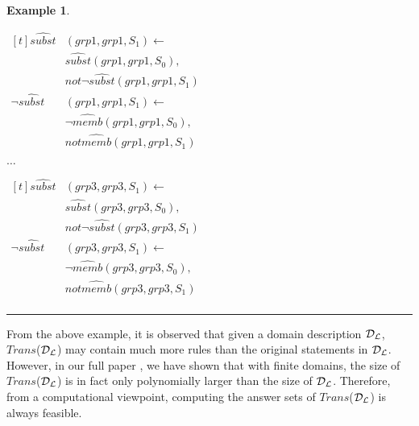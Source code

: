\documentclass[11pt, twocolumn]{article}
\newtheorem{vexmpl}{Example}
\newenvironment{vexample}
  {\begin{vexmpl}\rm}
  {\rule{2mm}{2mm}\end{vexmpl}}
\begin{document}
\begin{vexample}
\begin{enumerate}
              \begin{math}
                \begin{aligned}[t]
                  \hat{subst}&(grp1, grp1, S_{1}) \leftarrow \\
                  & \hat{subst}(grp1, grp1, S_{0}), \\
                  & not \lnot \hat{subst}(grp1, grp1, S_{1}) \\
                  \lnot \hat{subst}&(grp1, grp1, S_{1}) \leftarrow \\
                  & \lnot \hat{memb}(grp1, grp1, S_{0}), \\
                  & not \hat{memb}(grp1, grp1, S_{1})
                \end{aligned}
              \end{math}

              $\ldots$

              \begin{math}
                \begin{aligned}[t]
                  \hat{subst}&(grp3, grp3, S_{1}) \leftarrow \\
                  & \hat{subst}(grp3, grp3, S_{0}), \\
                  & not \lnot \hat{subst}(grp3, grp3, S_{1}) \\
                  \lnot \hat{subst}&(grp3, grp3, S_{1}) \leftarrow \\
                  & \lnot \hat{memb}(grp3, grp3, S_{0}), \\
                  & not \hat{memb}(grp3, grp3, S_{1}) \\
                \end{aligned}
              \end{math}
          \end{enumerate}
        \end{vexample}

        From the above example, it is observed that given a domain description
        ${\cal D_{L}}$, $Trans$(${\cal D_{L}}$) may contain much more rules
        than the original statements in ${\cal D_{L}}$. However, in our full
        paper \cite{CRE}, we have shown that with finite domains, the size of
        $Trans$(${\cal D_{L}}$) is in fact only polynomially larger than the
        size of ${\cal D_{L}}$. Therefore, from a computational viewpoint,
        computing the answer sets of $Trans$(${\cal D_{L}}$) is always
        feasible.
\end{document}
